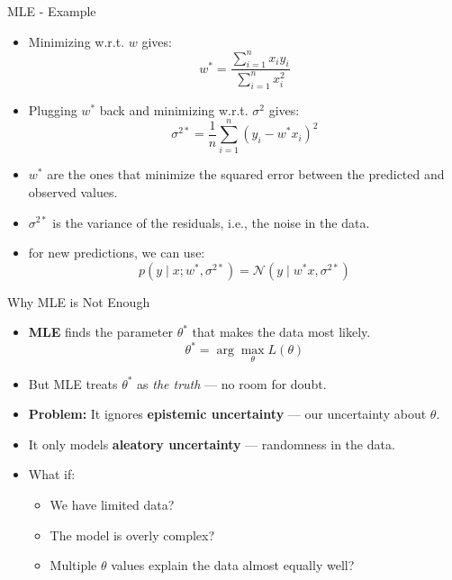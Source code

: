 \documentclass{beamer}
\begin{document}
\begin{frame}{MLE - Example}
  \begin{itemize}

    \item Minimizing w.r.t. $w$ gives:
    \[
      w^* = \frac{\sum_{i=1}^n x_i y_i}{\sum_{i=1}^n x_i^2}
    \]

    \item Plugging $w^*$ back and minimizing w.r.t. $\sigma^2$ gives:
    \[
      \sigma^{2*} = \frac{1}{n} \sum_{i=1}^n (y_i - w^* x_i)^2
    \]

  \item $w^*$ are the ones that minimize the squared error between the predicted and observed values.
  \item $\sigma^{2*}$ is the variance of the residuals, i.e., the noise in the data.
   \item for new predictions, we can use:
    \[
      p(y \mid x; w^*, \sigma^{2*}) = \mathcal{N}(y \mid w^* x, \sigma^{2*})
    \]
  \end{itemize}
\end{frame}


\begin{frame}{Why MLE is Not Enough}
  \begin{itemize}
    \item \textbf{MLE} finds the parameter $\theta^*$ that makes the data most likely.
    \[
      \theta^* = \arg\max_\theta L(\theta)
    \]
    \item But MLE treats $\theta^*$ as \textit{the truth} — no room for doubt.
    \item \textbf{Problem:} It ignores \textbf{epistemic uncertainty} — our uncertainty about $\theta$.
    \item It only models \textbf{aleatory uncertainty} — randomness in the data.
    \pause
    \item What if:
    \begin{itemize}
      \item We have limited data?
      \item The model is overly complex?
      \item Multiple $\theta$ values explain the data almost equally well?
    \end{itemize}
  \end{itemize}
\end{frame}
\end{document}
